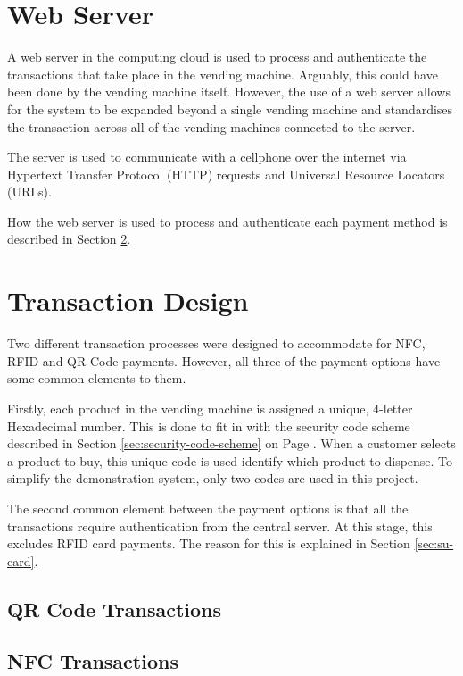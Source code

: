 \section{Web Server}

A web server in the computing cloud is used to process and authenticate the
transactions that take place in the vending machine. Arguably, this could have
been done by the vending machine itself. However, the use of a web server allows
for the system to be expanded beyond a single vending machine and standardises
the transaction across all of the vending machines connected to the server.

The server is used to communicate with a cellphone over the internet via
Hypertext Transfer Protocol (HTTP) requests and Universal Resource Locators
(URLs).

How the web server is used to process and authenticate each payment method is
described in Section \ref{sec:transaction}.
 
\section{Transaction Design}
\label{sec:transaction}

Two different transaction processes were designed to accommodate for NFC, RFID
and QR Code payments. However, all three of the payment options have some common
elements to them. 

Firstly, each product in the vending machine is assigned a unique, 4-letter
Hexadecimal number. This is done to fit in with the security code scheme
described in Section \ref{sec:security-code-scheme} on Page
\pageref{sec:security-code-scheme}. When a customer selects a product to buy,
this unique code is used identify which product to dispense. To simplify the
demonstration system, only two codes are used in this project.

The second common element between the payment options is that all the
transactions require authentication from the central server. At this stage, this
excludes RFID card payments. The reason for this is explained in Section
\ref{sec:su-card}. 

\subsection{QR Code Transactions}

\subsection{NFC Transactions}

